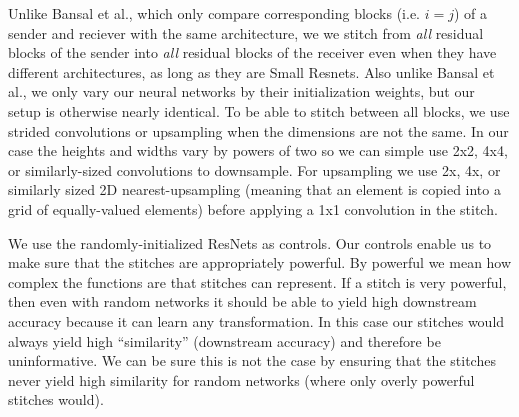 \documentclass{article}
\begin{document}
Unlike Bansal et al., which only compare corresponding blocks (i.e. $i = j$) of a sender and
reciever with the same architecture,
we we stitch from \textit{all} residual blocks of the sender into
\textit{all} residual blocks of the receiver even when they have different architectures, as long as
they are Small Resnets. Also unlike Bansal et al., we only vary
our neural networks by their initialization weights, but our setup is otherwise nearly identical. To
be able to stitch between all blocks, we use strided convolutions or upsampling when the dimensions
are not the same.
In our case the heights and widths vary by powers of two so we can simple use 2x2, 4x4,
or similarly-sized convolutions to downsample. For upsampling we use 2x, 4x, or similarly
sized 2D nearest-upsampling (meaning that an element is copied into a grid of equally-valued elements)
before applying a 1x1 convolution in the stitch.

We use the randomly-initialized ResNets as controls. Our controls enable us to make sure that
the stitches are appropriately powerful. By powerful we mean how complex the functions are that
stitches can represent. If a stitch is very powerful, then even with random networks it should be able to
yield high downstream accuracy because it can learn any transformation. In this case our 
stitches would always yield high ``similarity'' (downstream accuracy) and therefore be uninformative.
We can be sure this is not the case by ensuring that
the stitches never yield high similarity for random networks (where only overly powerful stitches
would).
\end{document}
